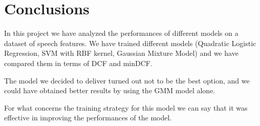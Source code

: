\documentclass[12pt]{report}
\newcommand{\nnl}{%
    \newline
    \newline
}
\newcommand{\nl}{%
    \newline
    \noindent
}
\begin{document}
\chapter{Conclusions}
In this project we have analyzed the performances of different models on a dataset of speech features. We have trained different models (Quadratic Logistic Regression, SVM with RBF kernel, Gaussian Mixture Model) and we have compared them in terms of DCF and minDCF.
\nnl
The model we decided to deliver turned out not to be the best option, and we could have obtained better results by using the GMM model alone.
\nl
For what concerns the training strategy for this model we can say that it was effective in improving the performances of the model.
\end{document}
